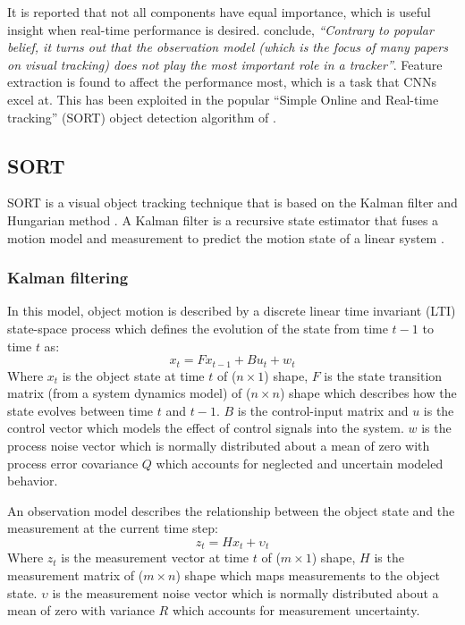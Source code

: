 \documentclass[a4paper,twoside,12pt]{report}
\begin{document}
It is reported that not all components have equal importance, which is useful insight when real-time performance is desired. \cite{diagnosingtrack} conclude, \textit{``Contrary to popular belief, it turns out that the observation model (which is the focus of many papers on visual tracking) does not play the most important role in a tracker''}. Feature extraction is found to affect the performance most, which is a task that CNNs excel at. This has been exploited in the popular ``Simple Online and Real-time tracking'' (SORT) object detection algorithm of \cite{sort}.

\subsection{SORT}

SORT is a visual object tracking technique that is based on the Kalman filter \citep{kalman} and Hungarian method \citep{hungarian}. A Kalman filter is a recursive state estimator that fuses a motion model and measurement to predict the motion state of a linear system \citep{trackbook}. 

\subsubsection{Kalman filtering}

In this model, object motion is described by a discrete linear time invariant (LTI) state-space process which defines the evolution of the state from time $t-1$ to time $t$ as:
\begin{equation} 
x_t=Fx_{t-1}+Bu_{t}+w_{t}
\end{equation}
Where $x_{t}$ is the object state at time $t$ of ($n \times 1$) shape, $F$ is the state transition matrix (from a system dynamics model) of ($n \times n$) shape which describes how the state evolves between time $t$ and $t-1$. $B$ is the control-input matrix and $u$ is the control vector which models the effect of control signals into the system. $w$ is the process noise vector which is normally distributed about a mean of zero with process error covariance $Q$ which accounts for neglected and uncertain modeled behavior.

An observation model describes the relationship between the object state and the measurement at the current time step:
\begin{equation} 
z_t=Hx_{t}+{\upsilon}_t
\end{equation}
Where $z_{t}$ is the measurement vector at time $t$ of ($m \times 1$) shape, $H$ is the measurement matrix of ($m \times n$) shape which maps measurements to the object state. $\upsilon$ is the measurement noise vector which is normally distributed about a mean of zero with variance $R$ which accounts for measurement uncertainty.
\end{document}
